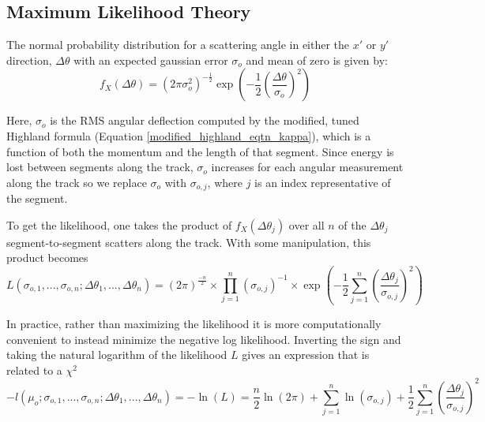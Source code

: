 \documentclass[a4paper,11pt]{article}
\begin{document}
\subsection{Maximum Likelihood Theory}\label{likelihood_theory_section}

The normal probability distribution for a scattering angle in either the $x'$ or $y'$ direction, $\Delta\theta$ with an expected gaussian error $\sigma_o$ and mean of zero is given by:
\begin{equation}
f_X(\Delta\theta) = (2\pi\sigma_o^2)^{-\frac{1}{2}}\exp(-\frac{1}{2}(\frac{\Delta\theta}{\sigma_o})^2)
\end{equation}

Here, $\sigma_o$ is the RMS angular deflection computed by the modified, tuned Highland formula (Equation \ref{modified_highland_eqtn_kappa}), which is a function of both the momentum and the length of that segment. Since energy is lost between segments along the track, $\sigma_o$ increases for each angular measurement along the track so we replace $\sigma_o$ with $\sigma_{o,j}$, where $j$ is an index representative of the segment. \newline

To get the likelihood, one takes the product of $f_X(\Delta\theta_j)$ over all $n$ of the $\Delta\theta_j$ segment-to-segment scatters along the track. With some manipulation, this product becomes
\begin{equation}
L(\sigma_{o,1},...,\sigma_{o,n};\Delta\theta_1,...,\Delta\theta_n) = (2\pi)^\frac{-n}{2}\times\prod_{j=1}^{n}(\sigma_{o,j})^{-1} \times \exp(-\frac{1}{2}\sum_{j=1}^{n}(\frac{\Delta\theta_j}{\sigma_{o,j}})^2)
\end{equation}

In practice, rather than maximizing the likelihood it is more computationally convenient to instead minimize the negative log likelihood. Inverting the sign and taking the natural logarithm of the likelihood $L$ gives an expression that is related to a $\chi^2$
\begin{equation}\label{leo_llhd_eqtn}
-l(\mu_o;\sigma_{o,1},...,\sigma_{o,n};\Delta\theta_1,...,\Delta\theta_n) = -\ln(L) = \frac{n}{2}\ln(2\pi) + \sum_{j=1}^{n}\ln(\sigma_{o,j}) + \frac{1}{2}\sum_{j=1}^{n}(\frac{\Delta\theta_j}{\sigma_{o,j}})^2
\end{equation}

\end{document}

